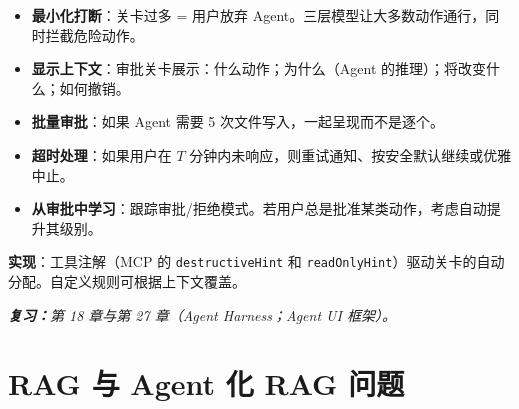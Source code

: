 \begin{questionbox}
\begin{itemize}
  \item \textbf{最小化打断}：关卡过多 = 用户放弃 Agent。三层模型让大多数动作通行，同时拦截危险动作。
  \item \textbf{显示上下文}：审批关卡展示：什么动作；为什么（Agent 的推理）；将改变什么；如何撤销。
  \item \textbf{批量审批}：如果 Agent 需要 5 次文件写入，一起呈现而不是逐个。
  \item \textbf{超时处理}：如果用户在 $T$ 分钟内未响应，则重试通知、按安全默认继续或优雅中止。
  \item \textbf{从审批中学习}：跟踪审批/拒绝模式。若用户总是批准某类动作，考虑自动提升其级别。
\end{itemize}

\textbf{实现}：工具注解（MCP 的 \texttt{destructiveHint} 和 \texttt{readOnlyHint}）驱动关卡的自动分配。自定义规则可根据上下文覆盖。

\emph{\textbf{复习：}第 18 章与第 27 章（Agent Harness；Agent UI 框架）。}
\end{questionbox}

\section{RAG 与 Agent 化 RAG 问题}
\label{rag-and-agentic-rag-questions}

